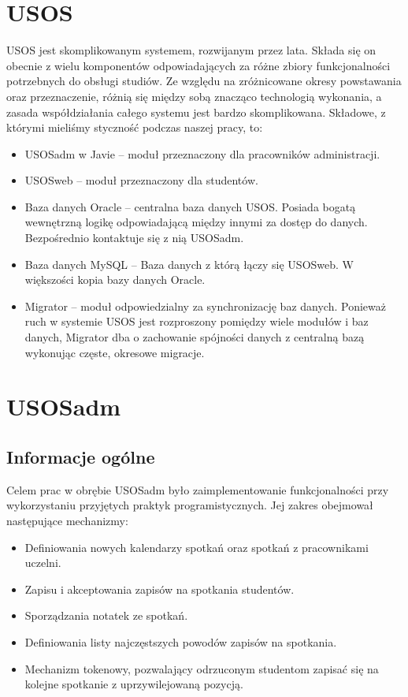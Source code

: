 \documentclass[licencjacka]{pracamgr}
\begin{document}
\section{USOS}
USOS jest skomplikowanym systemem, rozwijanym przez lata. Składa się on obecnie z wielu komponentów odpowiadających za różne zbiory funkcjonalności potrzebnych do obsługi studiów. Ze względu na zróżnicowane okresy powstawania oraz przeznaczenie, różnią się między sobą znacząco technologią wykonania, a zasada współdziałania całego systemu jest bardzo skomplikowana.
Składowe, z którymi mieliśmy styczność podczas naszej pracy, to:
\begin{itemize}
\item USOSadm w Javie -- moduł przeznaczony dla pracowników administracji.
\item USOSweb -- moduł przeznaczony dla studentów.
\item Baza danych Oracle -- centralna baza danych USOS. Posiada bogatą wewnętrzną logikę odpowiadającą między innymi za dostęp do danych. Bezpośrednio kontaktuje się z nią USOSadm.
\item Baza danych MySQL -- Baza danych z którą łączy się USOSweb. W większości kopia bazy danych Oracle.
\item Migrator -- moduł odpowiedzialny za synchronizację baz danych. Ponieważ ruch w systemie USOS jest rozproszony pomiędzy wiele modułów i baz danych, Migrator dba o zachowanie spójności danych z centralną bazą wykonując częste, okresowe migracje.
\end{itemize}

\section{USOSadm} \label{sec:impusos}

\subsection{Informacje ogólne}
Celem prac w obrębie USOSadm było zaimplementowanie funkcjonalności przy wykorzystaniu przyjętych praktyk programistycznych. Jej zakres obejmował następujące mechanizmy:
\begin{itemize}
\item Definiowania nowych kalendarzy spotkań oraz spotkań z pracownikami uczelni.
\item Zapisu i akceptowania zapisów na spotkania studentów.
\item Sporządzania notatek ze spotkań.
\item Definiowania listy najczęstszych powodów zapisów na spotkania.
\item Mechanizm tokenowy, pozwalający odrzuconym studentom zapisać się na kolejne spotkanie z uprzywilejowaną pozycją.
\end{itemize}
\end{document}
